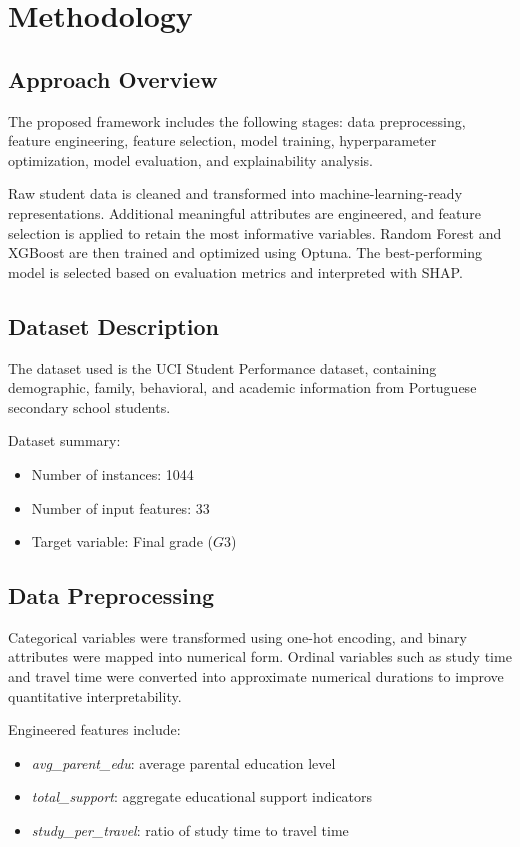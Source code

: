 \documentclass[12pt,a4paper]{article}
\begin{document}
\section{Methodology}
\subsection{Approach Overview}
The proposed framework includes the following stages: data preprocessing, feature engineering, feature selection, model training, hyperparameter optimization, model evaluation, and explainability analysis.

Raw student data is cleaned and transformed into machine-learning-ready representations. Additional meaningful attributes are engineered, and feature selection is applied to retain the most informative variables. Random Forest and XGBoost are then trained and optimized using Optuna. The best-performing model is selected based on evaluation metrics and interpreted with SHAP.

\subsection{Dataset Description}
The dataset used is the UCI Student Performance dataset, containing demographic, family, behavioral, and academic information from Portuguese secondary school students.

Dataset summary:
\begin{itemize}[leftmargin=1.5em]
	\item Number of instances: 1044
	\item Number of input features: 33
	\item Target variable: Final grade ($G3$)
\end{itemize}

\subsection{Data Preprocessing}
Categorical variables were transformed using one-hot encoding, and binary attributes were mapped into numerical form. Ordinal variables such as study time and travel time were converted into approximate numerical durations to improve quantitative interpretability.

Engineered features include:
\begin{itemize}[leftmargin=1.5em]
	\item \textit{avg\_parent\_edu}: average parental education level
	\item \textit{total\_support}: aggregate educational support indicators
	\item \textit{study\_per\_travel}: ratio of study time to travel time
\end{itemize}
\end{document}

